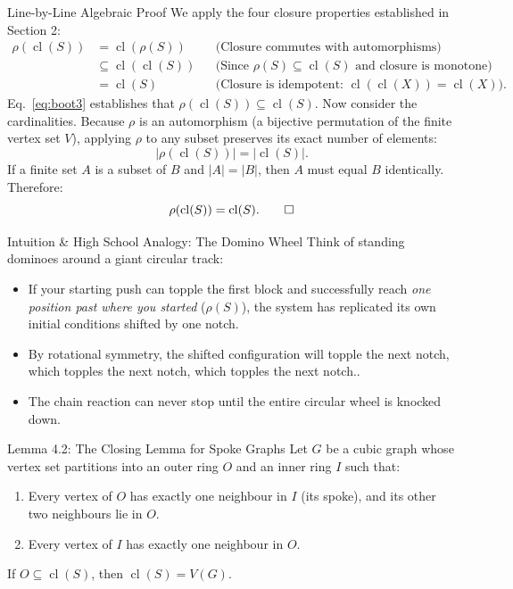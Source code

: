 \documentclass[11pt]{article}
\begin{document}
\begin{defbox}{Line-by-Line Algebraic Proof}
We apply the four closure properties established in Section 2:
\begin{align}
  \rho(\operatorname{cl}(S)) &= \operatorname{cl}(\rho(S)) && \text{(Closure commutes with automorphisms)} \label{eq:boot1}\\
  &\subseteq \operatorname{cl}(\operatorname{cl}(S)) && \text{(Since } \rho(S) \subseteq \operatorname{cl}(S) \text{ and closure is monotone)} \label{eq:boot2}\\
  &= \operatorname{cl}(S) && \text{(Closure is idempotent: } \operatorname{cl}(\operatorname{cl}(X)) = \operatorname{cl}(X)\text{)}. \label{eq:boot3}
\end{align}
Eq.~\eqref{eq:boot3} establishes that $\rho(\operatorname{cl}(S)) \subseteq \operatorname{cl}(S)$.
Now consider the cardinalities. Because $\rho$ is an automorphism (a bijective permutation of the finite vertex set $V$), applying $\rho$ to any subset preserves its exact number of elements:
\begin{equation}
  |\rho(\operatorname{cl}(S))| = |\operatorname{cl}(S)|.
\end{equation}
If a finite set $A$ is a subset of $B$ and $|A| = |B|$, then $A$ must equal $B$ identically.
Therefore:
\begin{equation}
  \rho(\operatorname{cl}(S)) = \operatorname{cl}(S). \qedhere
\end{equation}
\end{defbox}

\begin{intubox}{Intuition \& High School Analogy: The Domino Wheel}
Think of standing dominoes around a giant circular track:
\begin{itemize}[leftmargin=*,nosep]
  \item If your starting push can topple the first block and successfully reach \emph{one position past where you started} ($\rho(S)$), the system has replicated its own initial conditions shifted by one notch.
  \item By rotational symmetry, the shifted configuration will topple the next notch, which topples the next notch, which topples the next notch..
  \item The chain reaction can never stop until the entire circular wheel is knocked down.
\end{itemize}
\end{intubox}

\begin{thmbox}{Lemma 4.2: The Closing Lemma for Spoke Graphs}
Let $G$ be a cubic graph whose vertex set partitions into an outer ring $O$ and an inner ring $I$ such that:
\begin{enumerate}[leftmargin=*,nosep]
  \item Every vertex of $O$ has exactly one neighbour in $I$ (its spoke), and its other two neighbours lie in $O$.
  \item Every vertex of $I$ has exactly one neighbour in $O$.
\end{enumerate}
If $O \subseteq \operatorname{cl}(S)$, then $\operatorname{cl}(S) = V(G)$.
\end{thmbox}
\end{document}
